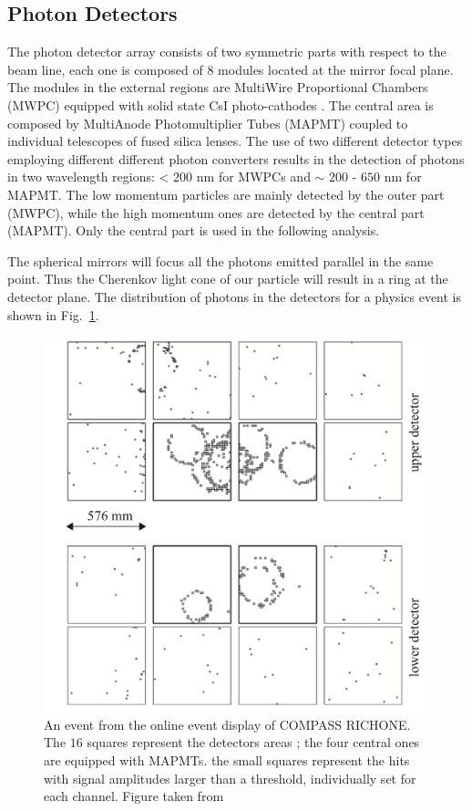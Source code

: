 \subsection{Photon Detectors}

The photon detector array consists of two symmetric parts with respect to the beam line, each one is composed of $8$ modules located at the mirror focal plane. The modules in the external regions are MultiWire Proportional Chambers (MWPC) equipped with solid state CsI photo-cathodes \cite{RICHLimits}. The central area is composed by MultiAnode Photomultiplier Tubes (MAPMT) \cite{RICHUpgrade} coupled to individual telescopes of fused silica lenses. The use of two different detector types employing different different photon converters results in the detection of photons in two wavelength regions: < $200$ nm for MWPCs and $\sim$ $200$ - $650$ nm for MAPMT. The low momentum particles are mainly detected by the outer part (MWPC), while the high momentum ones are detected by the central part (MAPMT). Only the central part is used in the following analysis.

The spherical mirrors will focus all the photons emitted parallel in the same point. Thus the Cherenkov light cone of our particle will result in a ring at the detector plane. The distribution of photons in the detectors for a physics event is shown in Fig.~\ref{pic:RICHEvent}.

\begin{figure}[!h]
  \centering
	\includegraphics[scale=0.5]{./gfx/RICHEvent.png}
	\caption{An event from the online event display of COMPASS RICHONE. The $16$ squares represent the detectors areas ; the four central ones are equipped with MAPMTs. the small squares represent the hits with signal amplitudes larger than a threshold, individually set for each channel. Figure taken from \cite{NIM2015}}
	\label{pic:RICHEvent}
\end{figure}


